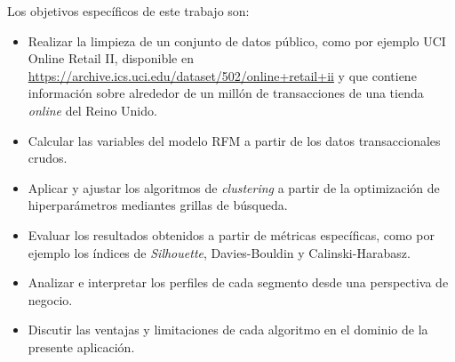 \documentclass[11 pts]{article}
\begin{document}
Los objetivos específicos de este trabajo son: 
\begin{itemize}
\item Realizar la limpieza de un conjunto de datos público, como por ejemplo UCI Online Retail II, disponible en \url{https://archive.ics.uci.edu/dataset/502/online+retail+ii} y que contiene información sobre alrededor de un millón de transacciones de una tienda \emph{online} del Reino Unido.
\item Calcular las variables del modelo RFM a partir de los datos transaccionales crudos.
\item Aplicar y ajustar los algoritmos de \emph{clustering} a partir de la optimización de hiperparámetros mediantes grillas de búsqueda.
\item Evaluar los resultados obtenidos a partir de  métricas específicas, como por ejemplo los índices de \emph{Silhouette}, Davies-Bouldin y Calinski-Harabasz.
\item Analizar e interpretar los perfiles de cada segmento desde una perspectiva de negocio.
\item Discutir las ventajas y limitaciones de cada algoritmo en el dominio de la presente aplicación.
\end{itemize}
\end{document}
